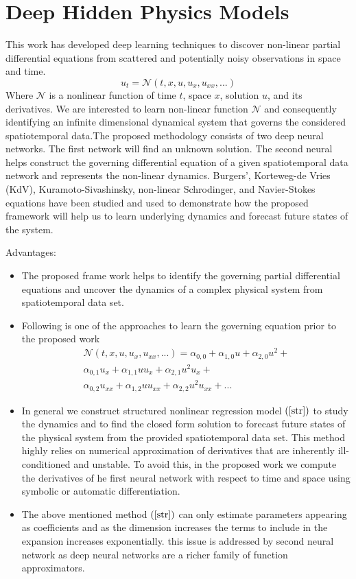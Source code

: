 \documentclass[a4sheet,12pt]{article}
\numberwithin{equation}{section}
\theoremstyle{remark}
\begin{document}
\section{Deep Hidden Physics Models}\cite{raissi2018deep}
This work has developed deep learning techniques to discover non-linear partial differential equations from scattered and potentially noisy observations in space and time. 
\begin{equation}
    u_{t} = \mathcal{N}\left(t,x,u,u_{x},u_{xx},...\right)
    \label{n}
\end{equation}
Where $\mathcal{N}$ is a nonlinear function of time $t$, space $x$, solution $u$, and its derivatives. We are interested to learn non-linear function $\mathcal{N}$ and consequently identifying an infinite dimensional dynamical system that governs the considered spatiotemporal data.The proposed methodology consists of two deep neural networks. The first network will find an unknown solution. The second neural helps construct the governing differential equation of a given spatiotemporal data  network and  represents the non-linear dynamics. Burgers', Korteweg-de Vries (KdV), Kuramoto-Sivashinsky, non-linear Schrodinger, and Navier-Stokes equations have been studied and used to demonstrate how the proposed framework will help us to learn underlying dynamics and forecast future states of the system.
\begin{subsection}{Advantages:}
\begin{itemize}
    \item The proposed frame work helps to identify the governing partial differential equations and uncover the dynamics of a complex physical system from spatiotemporal data set.
    \item Following is one of the approaches to learn the governing equation prior to the proposed work
    \begin{multline}
    \mathcal{N}\left(t,x,u,u_{x},u_{xx},...\right) = \alpha_{0,0} + \alpha_{1,0}u + \alpha_{2,0}u^{2} + \\
    \alpha_{0,1}u_{x} + \alpha_{1,1}u u_{x}+\alpha_{2,1}u^{2}u_{x}+\\
    \alpha_{0,2}u_{xx}+\alpha_{1,2}u u_{xx}+\alpha_{2,2}u^{2}u_{xx}+...
    \label{str}
    \end{multline}
    \item In general we construct structured nonlinear regression model $\left(\ref{str}\right)$ to study the dynamics and to find the closed form solution to forecast future states of the physical system from the provided spatiotemporal data set. This method highly relies on numerical approximation of derivatives that are inherently ill-conditioned and unstable. To avoid this, in the proposed work we compute the derivatives of he first neural network with respect to time and space using symbolic or automatic differentiation.
    \item The above mentioned method $\left(\ref{str}\right)$ can only estimate parameters appearing as coefficients and as the dimension increases the terms to include in the expansion increases exponentially. this issue is addressed by second neural network as deep neural networks are a richer family of function approximators.
\end{itemize}
\end{subsection}
\end{document}
